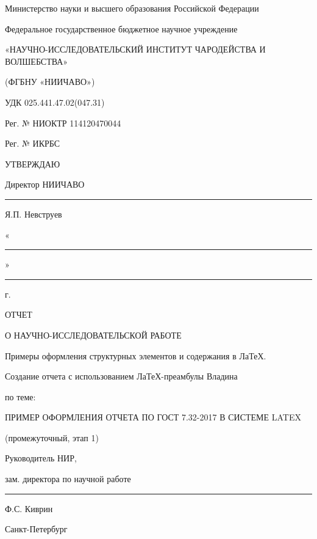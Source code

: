 

\thispagestyle{empty}

\begingroup
\fontsize{12}{14.4}\selectfont

\begin{center}
Министерство науки и высшего образования Российской Федерации

Федеральное государственное бюджетное научное учреждение

«НАУЧНО-ИССЛЕДОВАТЕЛЬСКИЙ ИНСТИТУТ ЧАРОДЕЙСТВА И ВОЛШЕБСТВА»

(ФГБНУ «НИИЧАВО»)
\end{center}

\vspace{\baselineskip}
\begin{flushleft}
УДК 025.441.47.02(047.31)

Рег. № НИОКТР 114120470044

Рег. № ИКРБС
\end{flushleft}

\vspace{\baselineskip}
\mbox{}\hfill
\begin{minipage}{0.4\linewidth}
УТВЕРЖДАЮ

Директор НИИЧАВО

\rule{6em}{.4pt} Я.П. Невструев

«\rule{2em}{.4pt}» \rule{5em}{.4pt} \the\year{} г.
\end{minipage}

\vspace{\baselineskip}
\begin{center}
ОТЧЕТ

О НАУЧНО-ИССЛЕДОВАТЕЛЬСКОЙ РАБОТЕ

\vspace{\baselineskip}

Примеры оформления структурных элементов и содержания в ЛаТеХ.

Создание отчета с использованием ЛаТеХ-преамбулы Владина

по теме:

ПРИМЕР ОФОРМЛЕНИЯ ОТЧЕТА ПО ГОСТ 7.32-2017 В СИСТЕМЕ LATEX

(промежуточный, этап 1)
\end{center}

\vfill
\begin{flushleft}
Руководитель НИР,

зам. директора по научной работе \hspace{1.5cm} \rule{3cm}{.4pt} Ф.С. Киврин
\end{flushleft}

\vfill

\begin{center}
Санкт-Петербург \the\year{}
\end{center}

\endgroup